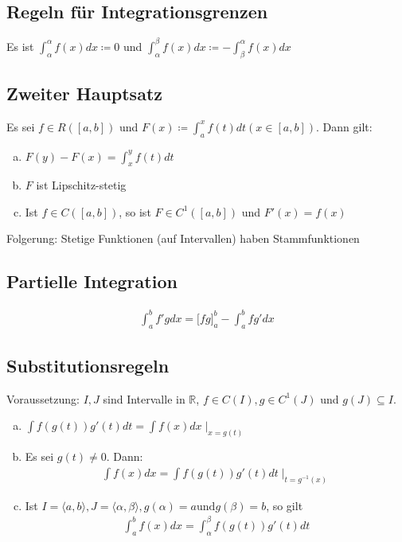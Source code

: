 \subsection{Regeln für Integrationsgrenzen}
Es ist $\int_\alpha^\alpha f(x) dx \coloneqq 0$ und $\int_\alpha^\beta f(x) dx \coloneqq -\int_\beta^\alpha f(x) dx$

\subsection{Zweiter Hauptsatz}
Es sei $f \in R([a,b])$ und $F(x) \coloneqq \int_a^x f(t) dt (x \in [a,b])$. Dann gilt:
\begin{enumerate}[a)]
    \item $F(y) - F(x) = \int_x^y f(t) dt$
    \item $F$ ist Lipschitz-stetig
    \item Ist $f \in C([a,b])$, so ist $F \in C^1([a,b])$ und $F'(x) = f(x)$
\end{enumerate}
Folgerung: Stetige Funktionen (auf Intervallen) haben Stammfunktionen

\subsection{Partielle Integration}
\begin{align*}
    \int_a^b f'g dx = \Big[fg \Big]_{a}^b - \int_a^b fg' dx
\end{align*}

\subsection{Substitutionsregeln}
Voraussetzung: $I,J$ sind Intervalle in $\mathbb{R}$, $f \in C(I), g \in C^1(J)$ und $g(J) \subseteq I$.
\begin{enumerate}[a)]
    \item $\int f(g(t)) g'(t) dt = \int f(x) dx \mid_{x=g(t)}$
    \item Es sei $g(t) \neq 0$. Dann:
    \begin{align*}
        \int f(x) dx = \int f(g(t)) g'(t) dt \mid_{t=g^{-1}(x)}
    \end{align*}
    \item Ist $I = \langle a,b \rangle, J = \langle \alpha, \beta \rangle, g(\alpha) = a \text{und} g(\beta)=b$, so gilt
    \begin{align*}
        \int_a^b f(x) dx = \int_\alpha^\beta f(g(t))g'(t)dt
    \end{align*}
\end{enumerate}

